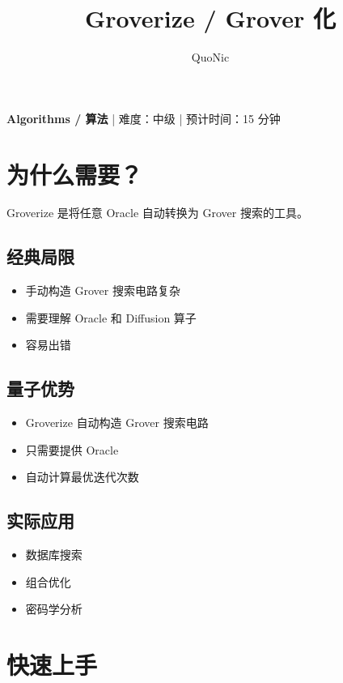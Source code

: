 \documentclass[12pt,a4paper]{article}
\title{Groverize / Grover 化}
\author{QuoNic}
\date{}
\begin{document}
\maketitle

\begin{center}
\textbf{Algorithms / 算法} | 难度：中级 | 预计时间：15 分钟
\end{center}

\tableofcontents
\newpage

\section{为什么需要？}

Groverize 是将任意 Oracle 自动转换为 Grover 搜索的工具。

\subsection{经典局限}
\begin{itemize}
  \item 手动构造 Grover 搜索电路复杂
  \item 需要理解 Oracle 和 Diffusion 算子
  \item 容易出错
\end{itemize}

\subsection{量子优势}
\begin{itemize}
  \item Groverize 自动构造 Grover 搜索电路
  \item 只需要提供 Oracle
  \item 自动计算最优迭代次数
\end{itemize}

\subsection{实际应用}
\begin{itemize}
  \item 数据库搜索
  \item 组合优化
  \item 密码学分析
\end{itemize}

\section{快速上手}
\end{document}
